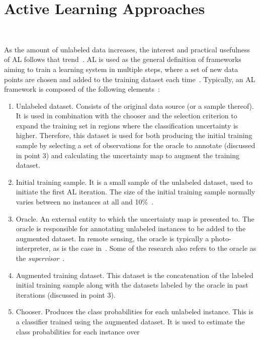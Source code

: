 \documentclass[preprint,12pt]{elsarticle}
\begin{document}
\section{Active Learning Approaches}~\label{sec:al-sota}

As the amount of unlabeled data increases, the interest and practical
usefulness of AL follows that trend~\cite{Kottke2017}. AL is used as the
general definition of frameworks aiming to train a learning system in multiple
steps, where a set of new data points are chosen and added to the training
dataset each time~\cite{Ruzicka2020}. Typically, an AL framework is composed of
the following elements~\cite{Sverchkov2017,Su2020,Ruzicka2020}:

\begin{enumerate}
    \item Unlabeled dataset. Consists of the original data source (or a sample
        thereof). It is used in combination with the chooser and the
        selection criterion to expand the training set in regions where the
        classification uncertainty is higher. Therefore, this dataset is used for both
        producing the initial training sample by selecting a set of
        observations for the oracle to annotate (discussed in point 3) and
        calculating the uncertainty map to augment the training dataset.
    \item Initial training sample. It is a small sample of the unlabeled
        dataset, used to initiate the first AL iteration. The size of the
        initial training sample normally varies between no instances at all
        and 10\%~\cite{Li2013}.
    \item Oracle. An external entity to which the uncertainty map is presented
        to. The oracle is responsible for annotating unlabeled instances to be
        added to the augmented dataset. In remote sensing, the oracle is
        typically a photo-interpreter, as is the case in~\cite{li2020}. Some of
        the research also refers to the oracle as the
        \textit{supervisor}~\cite{Su2020, Shrivastava2021}.
    \item Augmented training dataset. This dataset is the concatenation of the
        labeled initial training sample along with the datasets labeled by the
        oracle in past iterations (discussed in point 3).
    \item Chooser. Produces the class probabilities for each unlabeled
        instance. This is a classifier trained using the augmented dataset.
        It is used to estimate the class probabilities for each instance over

\end{enumerate}
\end{document}
